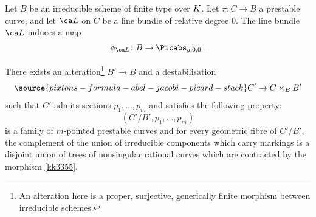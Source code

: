 Let $B$ be an irreducible scheme of finite type over ${K}$.
Let $\pi\colon C\to B$ a prestable curve, and let
$\ca L$ on $C$ be a line bundle
of relative degree $0$.
The line bundle $\ca L$ induces a map
$$\phi_{\ca L} \colon B \to \Picabs_{g,0,0}\, .$$

 \begin{lemma}
\notready There exists an \label{ALTt}
 alteration{\footnote{An alteration here is a proper, surjective, generically finite morphism between irreducible schemes.}}
 $B' \to B$ and a destabilisation
 \begin{equation}\label{kk3355}
\source{pixtons-formula-abel-jacobi-picard-stack}
 C' \to C \times_B B'
 \end{equation}
 such that $C'$ admits sections $p_1, \ldots, p_m$ and satisfies the
 following property:
 $$(C'/B', p_1, \ldots, p_m)$$ is a family of $m$-pointed prestable curves
 and
 for every geometric fibre of $C'/B'$,  the
complement of the union of irreducible components which carry markings
is a disjoint union of trees of nonsingular
rational curves which are contracted by the morphism \eqref{kk3355}.

\end{lemma}

